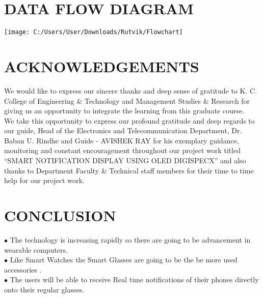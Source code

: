 \documentclass[12pt,a4paper,final,oneside]{report}
\begin{document}
	\chapter{DATA FLOW DIAGRAM}
	
	\texttt{[image: C:/Users/User/Downloads/Rutvik/Flowchart]}
	
	
	\chapter{ACKNOWLEDGEMENTS}
	We would like to express our sincere thanks and deep sense of  gratitude to K. C. College of Engineering \& Technology and Management  Studies \& Research for giving us an opportunity to integrate the learning  from this graduate course.\\
	\vspace{0.5cm}
	We take this opportunity to express our profound gratitude and  deep regards to our guide, Head of the Electronics and Telecommunication  Department, Dr. Baban U. Rindhe and Guide - AVISHEK RAY  for his exemplary guidance, monitoring and constant encouragement  throughout our project work titled “SMART NOTIFICATION DISPLAY USING OLED DIGISPECX” and also thanks to Department Faculty \& Technical staff members for their  time to time help for our project work.\\
	\centering 
	
	\chapter{CONCLUSION}
	$\bullet$ The technology is increasing rapidly so there are going to be advancement in wearable computers.\\ 
	$\bullet$ Like Smart Watches the Smart Glasses are going to be the be more used accessories . \\
	$\bullet$ The users will be able to receive Real time notifications of their phones directly onto their regular glasses.\\
	

	
\end{document}

